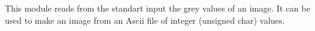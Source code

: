 This module reads from the standart input the grey values of an image.
It can be used to make an image from an Ascii file of integer (unsigned char) values.
